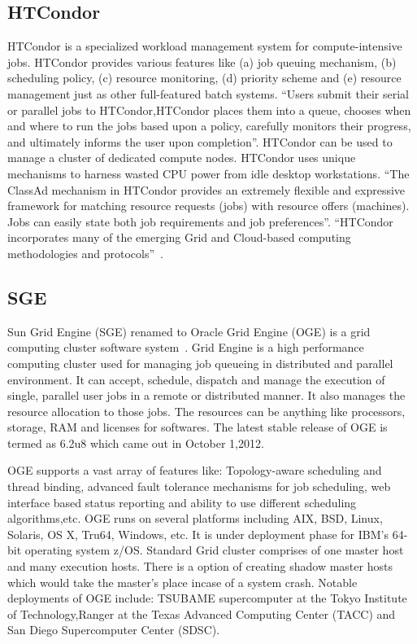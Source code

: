      \pv

     
\subsection{HTCondor}

    
HTCondor is a specialized workload management system for
compute-intensive jobs.  HTCondor provides various features like (a) job
queuing mechanism, (b) scheduling policy, (c) resource monitoring,
(d) priority scheme and (e) resource management just as other
full-featured batch systems.  ``Users submit their serial or parallel
jobs to HTCondor,HTCondor places them into a queue, chooses when and
where to run the jobs based upon a policy, carefully monitors their
progress, and ultimately informs the user upon completion''.  HTCondor
can be used to manage a cluster of dedicated compute nodes. HTCondor
uses unique mechanisms to harness wasted CPU power from idle desktop
workstations. ``The ClassAd mechanism in HTCondor provides an
extremely flexible and expressive framework for matching resource
requests (jobs) with resource offers (machines).  Jobs can easily
state both job requirements and job preferences''.  ``HTCondor
incorporates many of the emerging Grid and Cloud-based computing
methodologies and protocols''~\cite{htcondor}.

     \pv

     
\subsection{SGE}

Sun Grid Engine (SGE) renamed to Oracle Grid Engine (OGE) is a grid
computing cluster software system~\cite{www-sge-wiki}. Grid Engine is
a high performance computing cluster used for managing job queueing in
distributed and parallel environment. It can accept, schedule,
dispatch and manage the execution of single, parallel user jobs in a
remote or distributed manner. It also manages the resource allocation
to those jobs. The resources can be anything like processors, storage,
RAM and licenses for softwares. The latest stable release of OGE is
termed as 6.2u8 which came out in October 1,2012.

     OGE supports a vast array of features like: Topology-aware
     scheduling and thread binding, advanced fault tolerance
     mechanisms for job scheduling, web interface based status
     reporting and ability to use different scheduling
     algorithms,etc. OGE runs on several platforms including AIX, BSD,
     Linux, Solaris, OS X, Tru64, Windows, etc. It is under deployment
     phase for IBM's 64-bit operating system z/OS. Standard Grid
     cluster comprises of one master host and many execution
     hosts. There is a option of creating shadow master hosts which
     would take the master's place incase of a system crash. Notable
     deployments of OGE include: TSUBAME supercomputer at the Tokyo
     Institute of Technology,Ranger at the Texas Advanced Computing
     Center (TACC) and San Diego Supercomputer Center (SDSC).

